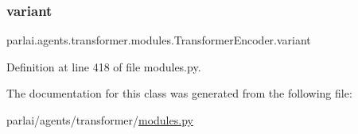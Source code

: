 \subsubsection{\texorpdfstring{variant}{variant}}
{\footnotesize\ttfamily parlai.\+agents.\+transformer.\+modules.\+Transformer\+Encoder.\+variant}



Definition at line 418 of file modules.\+py.



The documentation for this class was generated from the following file\+:\begin{DoxyCompactItemize}
\item 
parlai/agents/transformer/\hyperlink{parlai_2agents_2transformer_2modules_8py}{modules.\+py}\end{DoxyCompactItemize}
